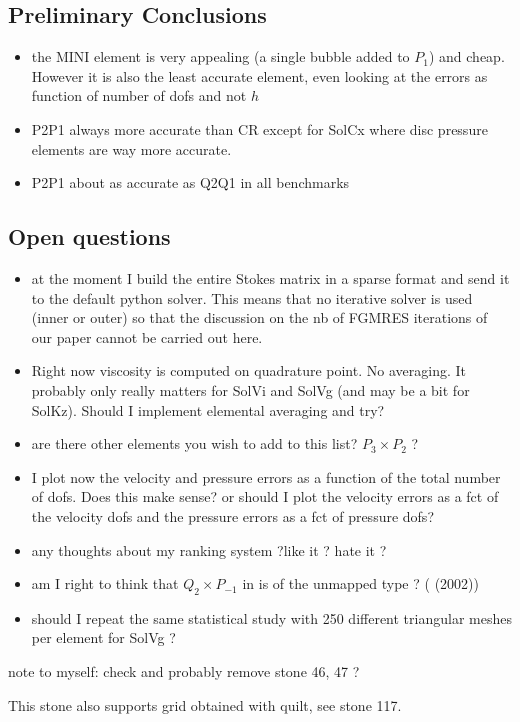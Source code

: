 \subsection*{Preliminary Conclusions}

\begin{itemize}
\item the MINI element is very appealing (a single bubble added to $P_1$) and cheap. However it is also 
the least accurate element, even looking at the errors as function of number of dofs and not $h$
\item P2P1 always more accurate than CR except for SolCx where disc pressure elements are way more accurate.
\item P2P1 about as accurate as Q2Q1 in all benchmarks
\end{itemize}


\subsection*{Open questions}

\begin{itemize}
\item at the moment I build the entire Stokes matrix in a sparse format and send it to the default 
python solver. This means that no iterative solver is used (inner or outer) so that the discussion 
on the nb of FGMRES iterations of our paper cannot be carried out here. 
\item Right now viscosity is computed on quadrature point. No averaging. It probably only really matters 
for SolVi and SolVg (and may be a bit for SolKz). Should I implement elemental averaging and try?  
\item are there other elements you wish to add to this list? $P_3\times P_2$ ? 
\item I plot now the velocity and pressure errors as a function of the total number of dofs. 
Does this make sense? or should I plot the velocity errors as a fct of the velocity dofs and 
the pressure errors  as a fct of pressure dofs?
\item any thoughts about my ranking system ?like it ? hate it ?
\item am I right to think that $Q_2\times P_{-1}$ in \aspect is of the unmapped type ?  (\textcite{boga02} (2002))
\item should I repeat the same statistical study with 250 different triangular meshes per element for SolVg ? 
\end{itemize}

\vspace{0.5cm}

note to myself: check and probably remove stone 46, 47 ?

This stone also supports grid obtained with quilt, see stone 117.
